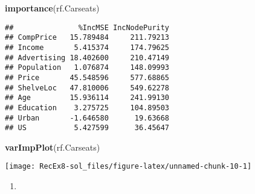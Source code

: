 \documentclass[]{article}
\newenvironment{Shaded}{\begin{snugshade}}{\end{snugshade}}
\newcommand{\DataTypeTok}[1]{\textcolor[rgb]{0.13,0.29,0.53}{#1}}
\newcommand{\DecValTok}[1]{\textcolor[rgb]{0.00,0.00,0.81}{#1}}
\newcommand{\FloatTok}[1]{\textcolor[rgb]{0.00,0.00,0.81}{#1}}
\newcommand{\KeywordTok}[1]{\textcolor[rgb]{0.13,0.29,0.53}{\textbf{#1}}}
\newcommand{\NormalTok}[1]{#1}
\newcommand{\OperatorTok}[1]{\textcolor[rgb]{0.81,0.36,0.00}{\textbf{#1}}}
\newcommand{\StringTok}[1]{\textcolor[rgb]{0.31,0.60,0.02}{#1}}
\begin{document}
\begin{Shaded}
\begin{Highlighting}[]
\KeywordTok{importance}\NormalTok{(rf.Carseats)}
\end{Highlighting}
\end{Shaded}

\begin{verbatim}
##               %IncMSE IncNodePurity
## CompPrice   15.789484     211.79213
## Income       5.415374     174.79625
## Advertising 18.402600     210.47149
## Population   1.076874     148.09993
## Price       45.548596     577.68865
## ShelveLoc   47.810006     549.62278
## Age         15.936114     241.99130
## Education    3.275725     104.89503
## Urban       -1.646580      19.63668
## US           5.427599      36.45647
\end{verbatim}

\begin{Shaded}
\begin{Highlighting}[]
\KeywordTok{varImpPlot}\NormalTok{(rf.Carseats)}
\end{Highlighting}
\end{Shaded}

\texttt{[image: RecEx8-sol\_files/figure-latex/unnamed-chunk-10-1]}

\begin{enumerate}
\def\labelenumi{\alph{enumi})}
\setcounter{enumi}{5}
\item
\end{enumerate}

\begin{Shaded}
\end{Shaded}
\end{document}
